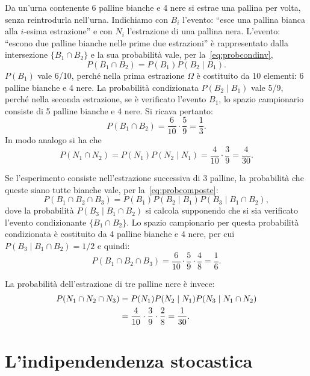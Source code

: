 \begin{exmp}
Da un'urna contenente 6 palline bianche e 4 nere si estrae una pallina per volta, senza reintrodurla nell'urna. 
Indichiamo con $B_i$ l'evento: ``esce una pallina bianca alla $i$-esima estrazione'' e con $N_i$ l'estrazione di una pallina nera. 
L'evento: ``escono due palline bianche nelle prime due estrazioni'' è rappresentato dalla intersezione $\{B_1 \cap  B_2\}$ e la sua probabilità vale, per la~\eqref{eq:probcondinv}, 
$$
P(B_1 \cap B_2) = P(B_1)P(B_2 \mid B_1).
$$ 
$P(B_1)$ vale 6/10, perché nella prima estrazione $\Omega$ è costituito da 10 elementi: 6 palline bianche e 4 nere. 
La probabilità condizionata $P(B_2 \mid B_1)$ vale 5/9, perché nella seconda estrazione, se è verificato l'evento $B_1$, lo spazio campionario consiste di 5 palline bianche e 4 nere. 
Si ricava pertanto: $$P(B_1 \cap B_2) = \frac{6}{10} \cdot \frac{5}{9} = \frac{1}{3}.$$ 
In modo analogo si ha che
$$
P(N_1 \cap N_2) = P(N_1)P(N_2 \mid N_1) = \frac{4}{10} \cdot \frac{3}{9} = \frac{4}{30}.
$$

Se l'esperimento consiste nell'estrazione successiva di 3 palline, la probabilità che
queste siano tutte bianche vale, per la~\eqref{eq:probcomposte}:
$$
P(B_1 \cap B_2 \cap B_3)=P(B_1)P(B_2 \mid B_1)P(B_3 \mid B_1 \cap B_2),
$$
dove la probabilità $P(B_3 \mid B_1 \cap B_2)$ si calcola supponendo che si sia verificato l'evento condizionante $\{B_1 \cap B_2\}$. 
Lo spazio campionario per questa probabilità condizionata è costituito da 4 palline bianche e 4 nere, per cui $P(B_3 \mid B_1 \cap B_2) = 1/2$ e quindi: 
$$
P (B_1 \cap B_2 \cap B_3) = \frac{6}{10}\cdot\frac{5}{9} \cdot\frac{4}{8}  = \frac{1}{6}. 
$$

La probabilità dell'estrazione di tre palline nere è invece:
\begin{align}
P(N_1 \cap N_2 \cap N_3) &= P(N_1)P(N_2 \mid N_1)P(N_3 \mid N_1 \cap N_2)\notag\\ 
&= \frac{4}{10} \cdot \frac{3}{9} \cdot \frac{2}{8} = \frac{1}{30}.\notag
\end{align}

\end{exmp}


\section{L'indipendendenza stocastica}

